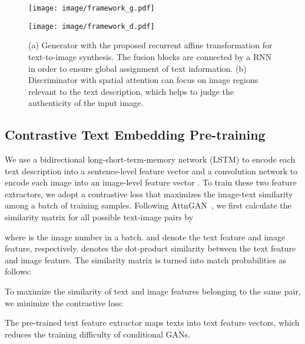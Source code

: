 \documentclass{article}
\begin{document}
	\begin{figure*}[t]
		\centering
\begin{minipage}{1\textwidth}\texttt{[image: image/framework\_g.pdf]}
		\vspace{-22.5pt}
		\caption*{(a)}
\end{minipage}

\begin{minipage}{1\textwidth}\texttt{[image: image/framework\_d.pdf]}
			\vspace{-19pt}
		\caption*{(b)}
\end{minipage}
		\vspace{-11pt}
\caption{\label{Fig:generator}(a) Generator with the proposed recurrent affine transformation for text-to-image synthesis. The fusion blocks are connected by a RNN in order to ensure global assignment of text information. (b) Discriminator with spatial attention can focus on image regions relevant to the text description, which helps to judge the authenticity of the input image.}
		\label{Fig:framework}
	\end{figure*}
	
	
	
	\subsection{Contrastive Text Embedding Pre-training \label{pre-training}}
	
	We use a bidirectional long-short-term-memory network (LSTM) to encode each text description into a sentence-level feature vector  and a convolution network to encode each image into an image-level feature vector . To train these two feature extractors, we adopt a contrastive loss that maximizes the image-text similarity among a batch of training samples.
	Following AttnGAN~\cite{DBLP:conf/cvpr/XuZHZGH018}, we first calculate the similarity matrix for all possible text-image pairs by
	
	where  is the image number in a batch.  and  denote the  text feature and image feature, respectively.  denotes the dot-product similarity between the  text feature and  image feature. The similarity matrix  is turned into match probabilities as follows:
	
	
	To maximize the similarity of text and image features belonging to the same pair, we minimize the contrastive loss:
	
	The pre-trained text feature extractor maps texts into text feature vectors, which reduces the training difficulty of conditional GANs.
	
\end{document}
